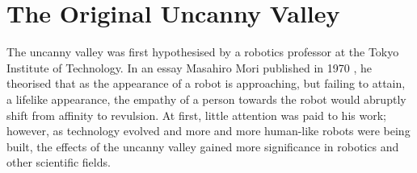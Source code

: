 \chapter{The Original Uncanny Valley}
\label{chap:2}
The uncanny valley was first hypothesised by a robotics professor at the Tokyo Institute of Technology. In an essay Masahiro Mori published in 1970 \cite{original_masahiro_not_translated}, he theorised that as the appearance of a robot is approaching, but failing to attain, a lifelike appearance, the empathy of a person towards the robot would abruptly shift from affinity to revulsion.
At first, little attention was paid to his work; however, as technology evolved and more and more human-like robots were being built, the effects of the uncanny valley gained more significance in robotics and other scientific fields.

